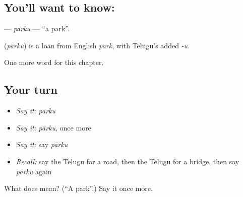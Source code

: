 \subsection*{You'll want to know: }
\textbf{} — \emph{pārku} — \textquotedblleft{}a park\textquotedblright{}.

\begin{cousinweb}
\textbf{} (\emph{pārku}) is a loan from English \emph{park}, with Telugu's added \emph{-u}.
\end{cousinweb}

\begin{grammarlens}[title={What you've built}]
One more word for this chapter.
\end{grammarlens}

\subsection*{Your turn}
\begin{itemize}
\raggedright
  \item \emph{Say it:} \emph{pārku}
  \item \emph{Say it:} \emph{pārku}, once more
  \item \emph{Say it:} say \emph{pārku}
  \item \emph{Recall:} say the Telugu for a road, then the Telugu for a bridge, then say \emph{pārku} again
\end{itemize}

\begin{tcolorbox}[breakable,colback=teal!4,colframe=teal!35!black,title={Before you move on}]
What does  mean? (\textquotedblleft{}A park\textquotedblright{}.) Say it once more.
\end{tcolorbox}
